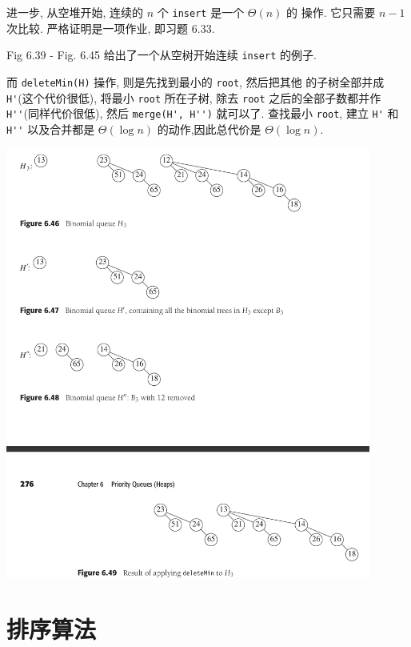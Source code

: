 \documentclass[a4paper]{ctexart}
\theoremstyle{definition}
\theoremstyle{definition}
\begin{document}
进一步, 从空堆开始, 连续的 $n$ 个 \verb|insert| 是一个 $\Theta(n)$ 的
操作. 它只需要 $n - 1$ 次比较. 严格证明是一项作业, 即习题 6.33.


Fig 6.39 - Fig. 6.45 给出了一个从空树开始连续 \verb|insert| 的例子.

而 \verb|deleteMin(H)| 操作, 则是先找到最小的 \verb|root|, 然后把其他
的子树全部并成 \verb|H'|(这个代价很低), 将最小 \verb|root| 所在子树,
除去 \verb|root| 之后的全部子数都并作 \verb|H''|(同样代价很低), 然后
\verb|merge(H', H'')| 就可以了. 查找最小 \verb|root|, 建立 \verb|H'|
和 \verb|H''| 以及合并都是 $\Theta(\log n)$ 的动作,因此总代价是
$\Theta(\log n)$.

\begin{center}
  \includegraphics[width=0.9\textwidth]{images/delMin_B_tree.png}
\end{center}

\section{排序算法}
\end{document}
